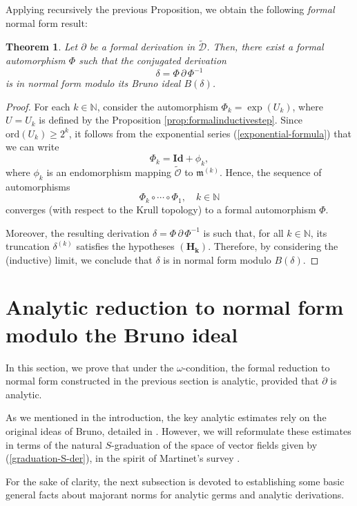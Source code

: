 \documentclass[10pt,twoside,reqno]{amsart}
\newtheorem{thm}{Theorem}[section]
\theoremstyle{remark}
\theoremstyle{remark}
\newcommand{\N}{\mathbb{N}}
\newcommand{\ord}{\mathrm{ord}}
\newcommand{\tO}{\widetilde{\mathcal{O}}}
\newcommand{\cD}{\mathcal{D}}
\newcommand{\tcD}{\widetilde{\cD}}
\begin{document}
Applying recursively the previous Proposition, we obtain the following {\em formal} normal form result:
\begin{thm}
   \label{thm:formalnormalizationtruncated}
		  Let $\partial$ be a formal derivation in $\tcD$. Then, there exist a formal automorphism $\Phi$ such that the conjugated derivation
          $$\delta= \Phi\, \partial\, \Phi^{-1}$$ 
          is in normal form modulo its Bruno ideal $B(\delta)$.
\end{thm}
\begin{proof}
    For each $k \in \N$, consider the automorphism $\Phi_k = \exp(U_k)$, where $U=U_k$ is defined by the Proposition \ref{prop:formalinductivestep}. Since $\ord(U_k) \ge 2^k$, it follows from the exponential series (\ref{exponential-formula}) that we can write
    $$
    \Phi_k = \mathbf{Id} + \phi_k,
    $$
    where $\phi_k$ is an endomorphism mapping $\tO$ to $\mathfrak{m}^{(k)}$. Hence, the sequence of automorphisms
    $$
    \Phi_k\circ \cdots \circ \Phi_1,\quad k\in \N
    $$
    converges (with respect to the Krull topology) to a formal automorphism $\Phi$. 
    
    Moreover, the resulting derivation $\delta = \Phi\, \partial\, \Phi^{-1}$ is such that, for all $k\in \N$, its truncation $\delta^{(k)}$ satisfies the hypotheses $\mathbf{(H_k)}$.  Therefore, by considering the (inductive) limit, we conclude that $\delta$ is in normal form modulo $B(\delta)$.
\end{proof}
\section{Analytic reduction to normal form modulo the Bruno ideal}\label{sec:analyticreduction}
In this section, we prove that under the $\omega$-condition, the formal reduction to normal form constructed in the previous section is analytic, provided that $\partial$ is analytic. 

As we mentioned in the introduction, the key analytic estimates rely on the original ideas of Bruno, detailed in \cite{Bruno1971_1972}. However, we will reformulate these estimates in terms of the natural $S$-graduation of the space of vector fields given by (\ref{graduation-S-der}), in the spirit of Martinet's survey \cite{Martinet1981Norm}.

For the sake of clarity, the next subsection is devoted to establishing some basic general facts about majorant norms for analytic germs and analytic derivations.
\end{document}

